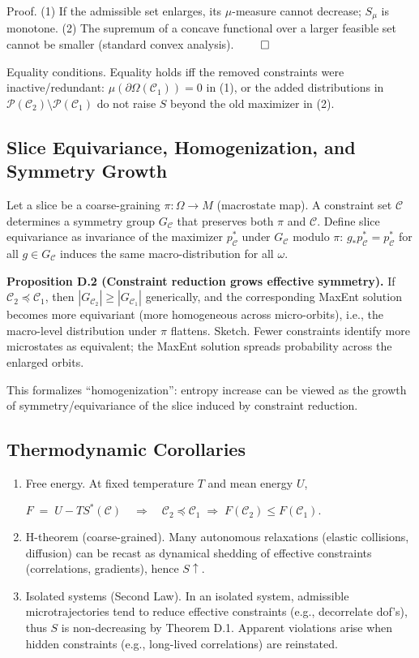 \documentclass[12pt,a4paper]{article}
\begin{document}
Proof.
(1) If the admissible set enlarges, its $\mu$-measure cannot decrease; $S_\mu$ is monotone.
(2) The supremum of a concave functional over a larger feasible set cannot be smaller (standard convex analysis). $\qed$

Equality conditions. Equality holds iff the removed constraints were inactive/redundant: $\mu(\partial \Omega(\mathcal{C}_1)) = 0$ in (1), or the added distributions in $\mathcal{P}(\mathcal{C}_2) \setminus \mathcal{P}(\mathcal{C}_1)$ do not raise $S$ beyond the old maximizer in (2).

\subsection{Slice Equivariance, Homogenization, and Symmetry Growth}

Let a slice be a coarse-graining $\pi: \Omega \to M$ (macrostate map). A constraint set $\mathcal{C}$ determines a symmetry group $G_\mathcal{C}$ that preserves both $\pi$ and $\mathcal{C}$.
Define slice equivariance as invariance of the maximizer $p^*_\mathcal{C}$ under $G_\mathcal{C}$ modulo $\pi$: $g_* p^*_\mathcal{C} = p^*_\mathcal{C}$ for all $g \in G_\mathcal{C}$ induces the same macro-distribution for all $\omega$.

\textbf{Proposition D.2 (Constraint reduction grows effective symmetry).} If $\mathcal{C}_2 \preceq \mathcal{C}_1$, then $|G_{\mathcal{C}_2}| \geq |G_{\mathcal{C}_1}|$ generically, and the corresponding MaxEnt solution becomes more equivariant (more homogeneous across micro-orbits), i.e., the macro-level distribution under $\pi$ flattens.
Sketch. Fewer constraints identify more microstates as equivalent; the MaxEnt solution spreads probability across the enlarged orbits.

This formalizes “homogenization”: entropy increase can be viewed as the growth of symmetry/equivariance of the slice induced by constraint reduction.

\subsection{Thermodynamic Corollaries}

\begin{enumerate}
\item Free energy. At fixed temperature $T$ and mean energy $U$,

$F \;=\; U - T S^*(\mathcal{C}) \quad\Rightarrow\quad 
   \mathcal{C}_2 \preceq \mathcal{C}_1 \;\Longrightarrow\; F(\mathcal{C}_2)\le F(\mathcal{C}_1).$

\item H-theorem (coarse-grained). Many autonomous relaxations (elastic collisions, diffusion) can be recast as dynamical shedding of effective constraints (correlations, gradients), hence $S \uparrow$.

\item Isolated systems (Second Law). In an isolated system, admissible microtrajectories tend to reduce effective constraints (e.g., decorrelate dof’s), thus $S$ is non-decreasing by Theorem D.1. Apparent violations arise when hidden constraints (e.g., long-lived correlations) are reinstated.
\end{enumerate}
\end{document}
